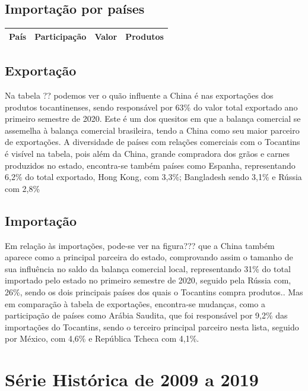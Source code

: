 \subsection{Importação por países}
\begin{tabular}{|c|c|c|c|}
	\hline
	País & Participação & Valor & Produtos \\
	\hline
\end{tabular}

\subsection{Exportação}
\par Na tabela ?? podemos ver o quão influente a China é nas exportações dos produtos tocantinenses, sendo responsável por 63\% do valor total exportado ano primeiro semestre de 2020. Este é um dos quesitos em que a balança comercial se assemelha à balança comercial brasileira, tendo a China como seu maior parceiro de exportações. 
A diversidade de países com relações comerciais com o Tocantins é visível na tabela, pois além da China, grande compradora dos grãos e carnes produzidos no estado, encontra-se também países como Espanha, representando 6,2\% do total exportado, Hong Kong, com 3,3\%; Bangladesh sendo 3,1\% e Rússia com 2,8\%

\subsection{Importação}
\par Em relação às importações, pode-se ver na figura??? que a China também aparece como a principal parceira do estado, comprovando assim o tamanho de sua influência no saldo da balança comercial local, representando 31\% do total importado pelo estado no primeiro semestre de 2020, seguido pela Rússia com, 26\%, sendo os dois principais países dos quais o Tocantins compra produtos.. Mas em comparação à tabela de exportações, encontra-se mudanças, como a participação de países como Arábia Saudita, que foi responsável por 9,2\% das importações do Tocantins, sendo o terceiro principal parceiro nesta lista, seguido por México, com 4,6\% e República Tcheca com 4,1\%.

\section{Série Histórica de 2009 a 2019}

